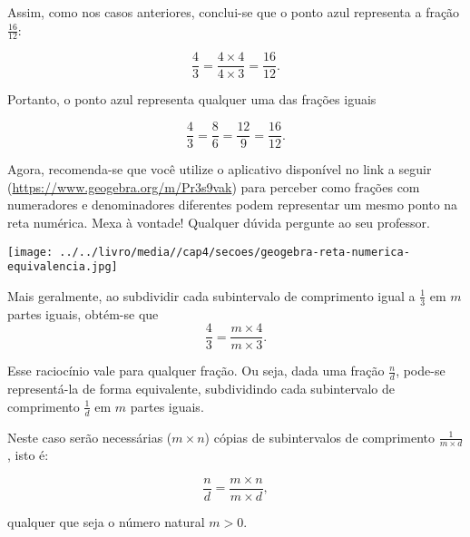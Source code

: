 \documentclass[a4,12pt]{book}
\begin{document}
\begin{refletindo*}
\begin{center}
\end{center}

Assim, como nos casos anteriores, conclui-se que o ponto azul representa a fração $\frac{16}{12}$:

$$\dfrac{4}{3} = \dfrac{4 \times 4}{4 \times 3} = \dfrac{16}{12}.$$

Portanto, o ponto azul representa qualquer uma das frações iguais

$$\dfrac{4}{3} = \dfrac{8}{6} = \dfrac{12}{9} = \dfrac{16}{12}.$$

Agora, recomenda-se que você utilize o aplicativo disponível no link a seguir (\url{https://www.geogebra.org/m/Pr3s9vak}) para perceber como frações com numeradores e denominadores diferentes podem representar um mesmo ponto  na reta numérica. Mexa à vontade! Qualquer dúvida pergunte ao seu professor.
\begin{center}
\texttt{[image: ../../livro/media//cap4/secoes/geogebra-reta-numerica-equivalencia.jpg]}
\end{center}

Mais geralmente, ao subdividir cada subintervalo de comprimento igual a $\frac{1}{3}$ em $m$ partes iguais, obtém-se que
$$\dfrac{4}{3} = \dfrac{m \times 4}{m \times 3}.$$

Esse raciocínio vale para qualquer fração. Ou seja, dada uma fração $\frac{n}{d}$, pode-se representá-la de forma equivalente, subdividindo cada subintervalo de comprimento $\frac{1}{d}$ em $m$ partes iguais. 

Neste caso serão necessárias ($m \times n$) cópias de subintervalos de comprimento $\frac{1}{m \times d}$, isto é:

$$\dfrac{n}{d} = \dfrac{m \times n}{m \times d},$$

qualquer que seja o número natural $m > 0$.

\end{refletindo*}
\end{document}
